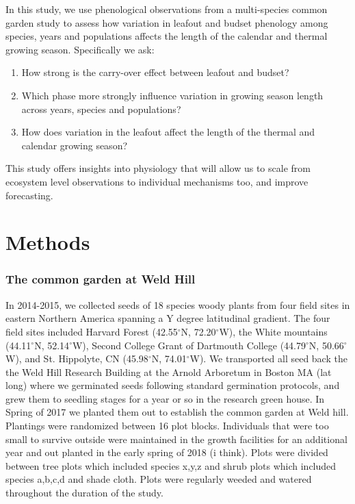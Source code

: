 \documentclass[12 pt]{article}
\begin{document}
In this study, we use phenological observations from a multi-species common garden study to 
assess how variation in leafout and  budset phenology among species, years and populations affects the length of the calendar and thermal growing season. Specifically we ask:

\begin{enumerate} %
\item How strong is the carry-over effect between leafout and budset? 
\item Which phase more strongly influence variation in growing season length across years, species and populations?
\item How does variation in the leafout affect the length of the thermal and calendar growing season?
\end{enumerate}

This study offers insights into physiology that will allow us to scale from ecosystem level observations to individual mechanisms too, and improve forecasting. %

\section{Methods}
\subsubsection{The common garden at Weld Hill}
In 2014-2015, we collected seeds of 18 species woody plants from four field sites in eastern Northern America spanning a Y degree latitudinal gradient. The four field sites included Harvard Forest (42.55$^{\circ}$N, 72.20$^{\circ}$W), the White mountains (44.11$^{\circ}$N, 52.14$^{\circ}$W), Second College Grant of Dartmouth College (44.79$^{\circ}$N, 50.66$^{\circ}$W), and St. Hippolyte, CN (45.98$^{\circ}$N, 74.01$^{\circ}$W). We transported all seed back the the Weld Hill Research Building at the Arnold Arboretum in Boston MA (lat long) where we germinated seeds following standard germination protocols, and grew them to seedling stages for a year or so in the research green house. In Spring of 2017 we planted them out to establish the common garden at Weld hill. Plantings were randomized between 16 plot blocks. Individuals that were too small to survive outside were maintained in the growth facilities for an additional year and out planted in the early spring of 2018 (i think). Plots were divided between tree plots which included species x,y,z and shrub plots which included species a,b,c,d and shade cloth. Plots were regularly weeded and watered throughout the duration of the study.
\end{document}
